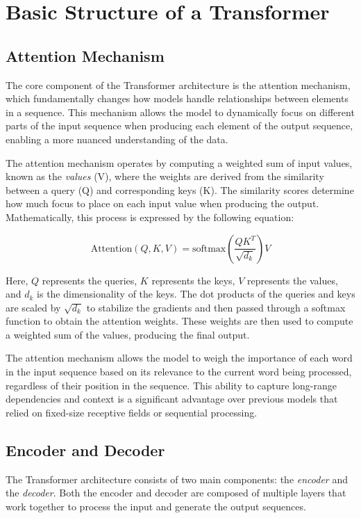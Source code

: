 \section{Basic Structure of a Transformer}

\subsection{Attention Mechanism}

The core component of the Transformer architecture is the attention mechanism, which fundamentally changes how models handle relationships between elements in a sequence. This mechanism allows the model to dynamically focus on different parts of the input sequence when producing each element of the output sequence, enabling a more nuanced understanding of the data.

The attention mechanism operates by computing a weighted sum of input values, known as the \textit{values} (V), where the weights are derived from the similarity between a query (Q) and corresponding keys (K). The similarity scores determine how much focus to place on each input value when producing the output. Mathematically, this process is expressed by the following equation:

\[
	\text{Attention}(Q, K, V) = \text{softmax}\left(\frac{QK^T}{\sqrt{d_k}}\right)V
\]

Here, \( Q \) represents the queries, \( K \) represents the keys, \( V \) represents the values, and \( d_k \) is the dimensionality of the keys. The dot products of the queries and keys are scaled by \( \sqrt{d_k} \) to stabilize the gradients and then passed through a softmax function to obtain the attention weights. These weights are then used to compute a weighted sum of the values, producing the final output.

The attention mechanism allows the model to weigh the importance of each word in the input sequence based on its relevance to the current word being processed, regardless of their position in the sequence. This ability to capture long-range dependencies and context is a significant advantage over previous models that relied on fixed-size receptive fields or sequential processing.

\subsection{Encoder and Decoder}

The Transformer architecture consists of two main components: the \textit{encoder} and the \textit{decoder}. Both the encoder and decoder are composed of multiple layers that work together to process the input and generate the output sequences.

